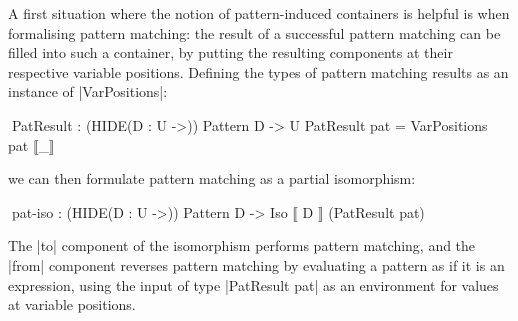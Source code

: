 \documentclass[fleqn]{llncs}
\begin{document}

A first situation where the notion of pattern-induced containers is helpful is when formalising pattern matching:
the result of a successful pattern matching can be filled into such a container, by putting the resulting components at their respective variable positions.
Defining the types of pattern matching results as an instance of |VarPositions|:
\begin{code}
^^^PatResult : (HIDE({D : U} ->)) Pattern D -> U
PatResult pat = VarPositions pat ⟦_⟧
\end{code}
we can then formulate pattern matching as a partial isomorphism:
\begin{code}
^^^pat-iso : (HIDE({D : U} ->)) Pattern D -> Iso ⟦ D ⟧ (PatResult pat)
\end{code}
The |to| component of the isomorphism performs pattern matching, and the |from| component reverses pattern matching by evaluating a pattern as if it is an expression, using the input of type |PatResult pat| as an environment for values at variable positions.
\end{document}
